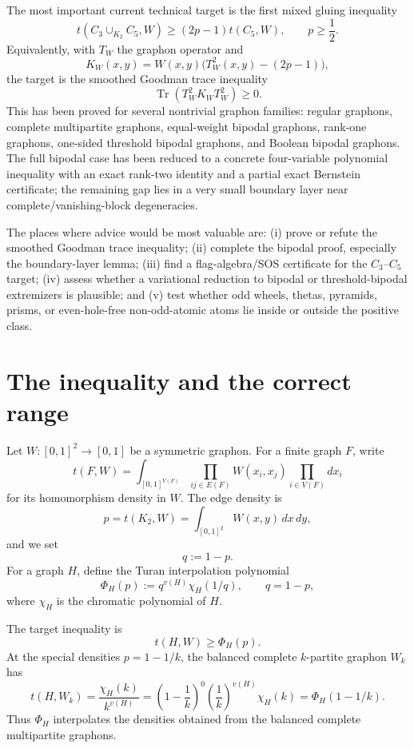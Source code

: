 \documentclass[11pt]{article}
\theoremstyle{definition}
\begin{document}
The most important current technical target is the first mixed gluing inequality
\[
        t(C_3\cup_{K_2}C_5,W)\ge (2p-1)t(C_5,W), \qquad p\ge \frac12.
\]
Equivalently, with $T_W$ the graphon operator and
\[
        K_W(x,y)=W(x,y)\bigl(T_W^2(x,y)-(2p-1)\bigr),
\]
the target is the smoothed Goodman trace inequality
\[
        \operatorname{Tr}(T_W^2K_WT_W^2)\ge0.
\]
This has been proved for several nontrivial graphon families: regular graphons, complete multipartite graphons, equal-weight bipodal graphons, rank-one graphons, one-sided threshold bipodal graphons, and Boolean bipodal graphons.  The full bipodal case has been reduced to a concrete four-variable polynomial inequality with an exact rank-two identity and a partial exact Bernstein certificate; the remaining gap lies in a very small boundary layer near complete/vanishing-block degeneracies.

The places where advice would be most valuable are: (i) prove or refute the smoothed Goodman trace inequality; (ii) complete the bipodal proof, especially the boundary-layer lemma; (iii) find a flag-algebra/SOS certificate for the $C_3$--$C_5$ target; (iv) assess whether a variational reduction to bipodal or threshold-bipodal extremizers is plausible; and (v) test whether odd wheels, thetas, pyramids, prisms, or even-hole-free non-odd-atomic atoms lie inside or outside the positive class.

\tableofcontents

\section{The inequality and the correct range}

Let $W:[0,1]^2\to[0,1]$ be a symmetric graphon.  For a finite graph $F$, write
\[
  t(F,W)=\int_{[0,1]^{V(F)}}\prod_{ij\in E(F)}W(x_i,x_j)\prod_{i\in V(F)}dx_i
\]
for its homomorphism density in $W$.  The edge density is
\[
  p=t(K_2,W)=\int_{[0,1]^2}W(x,y)\,dx\,dy,
\]
and we set
\[
  q:=1-p.
\]
For a graph $H$, define the Turan interpolation polynomial
\[
  \Phi_H(p):=q^{v(H)}\chi_H(1/q),
  \qquad q=1-p,
\]
where $\chi_H$ is the chromatic polynomial of $H$.

The target inequality is
\begin{equation}\label{eq:main-ineq}
  t(H,W)\ge \Phi_H(p).
\end{equation}
At the special densities $p=1-1/k$, the balanced complete $k$-partite graphon $W_k$ has
\[
  t(H,W_k)=\frac{\chi_H(k)}{k^{v(H)}}
  =\left(1-\frac1k\right)^{0}\left(\frac1k\right)^{v(H)}\chi_H(k)
  =\Phi_H(1-1/k).
\]
Thus $\Phi_H$ interpolates the densities obtained from the balanced complete multipartite graphons.
\end{document}
